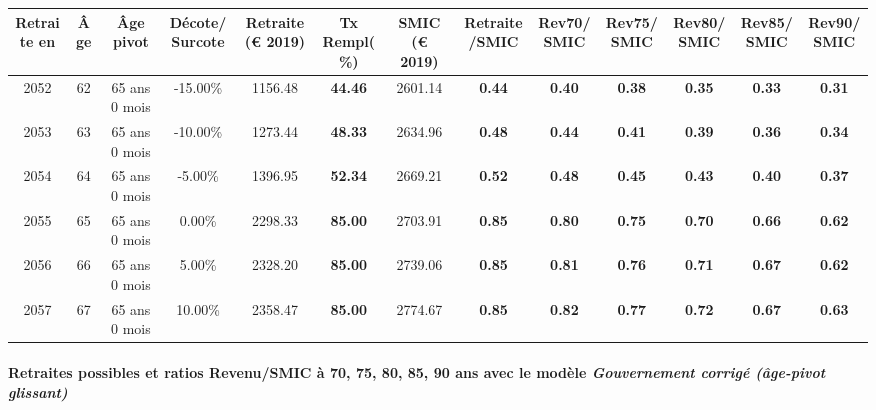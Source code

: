 { \scriptsize \begin{center} 
\begin{tabular}[htb]{|c|c||c|c||c|c||c||c|c|c|c|c|c|} 
\hline 
 Retraite en &  Âge &  Âge pivot &  Décote/Surcote &  Retraite (\euro{} 2019) &  Tx Rempl(\%) &  SMIC (\euro{} 2019) &  Retraite/SMIC &  Rev70/SMIC &  Rev75/SMIC &  Rev80/SMIC &  Rev85/SMIC &  Rev90/SMIC \\ 
\hline \hline 
 2052 &  62 &  65 ans 0 mois &  -15.00\% &  1156.48 &  {\bf 44.46} &  2601.14 &  {\bf {\color{red} 0.44}} &  {\bf {\color{red} 0.40}} &  {\bf {\color{red} 0.38}} &  {\bf {\color{red} 0.35}} &  {\bf {\color{red} 0.33}} &  {\bf {\color{red} 0.31}} \\ 
\hline 
 2053 &  63 &  65 ans 0 mois &  -10.00\% &  1273.44 &  {\bf 48.33} &  2634.96 &  {\bf {\color{red} 0.48}} &  {\bf {\color{red} 0.44}} &  {\bf {\color{red} 0.41}} &  {\bf {\color{red} 0.39}} &  {\bf {\color{red} 0.36}} &  {\bf {\color{red} 0.34}} \\ 
\hline 
 2054 &  64 &  65 ans 0 mois &  -5.00\% &  1396.95 &  {\bf 52.34} &  2669.21 &  {\bf {\color{red} 0.52}} &  {\bf {\color{red} 0.48}} &  {\bf {\color{red} 0.45}} &  {\bf {\color{red} 0.43}} &  {\bf {\color{red} 0.40}} &  {\bf {\color{red} 0.37}} \\ 
\hline 
 2055 &  65 &  65 ans 0 mois &  0.00\% &  2298.33 &  {\bf 85.00} &  2703.91 &  {\bf {\color{red} 0.85}} &  {\bf {\color{red} 0.80}} &  {\bf {\color{red} 0.75}} &  {\bf {\color{red} 0.70}} &  {\bf {\color{red} 0.66}} &  {\bf {\color{red} 0.62}} \\ 
\hline 
 2056 &  66 &  65 ans 0 mois &  5.00\% &  2328.20 &  {\bf 85.00} &  2739.06 &  {\bf {\color{red} 0.85}} &  {\bf {\color{red} 0.81}} &  {\bf {\color{red} 0.76}} &  {\bf {\color{red} 0.71}} &  {\bf {\color{red} 0.67}} &  {\bf {\color{red} 0.62}} \\ 
\hline 
 2057 &  67 &  65 ans 0 mois &  10.00\% &  2358.47 &  {\bf 85.00} &  2774.67 &  {\bf {\color{red} 0.85}} &  {\bf {\color{red} 0.82}} &  {\bf {\color{red} 0.77}} &  {\bf {\color{red} 0.72}} &  {\bf {\color{red} 0.67}} &  {\bf {\color{red} 0.63}} \\ 
\hline 
\hline 
\end{tabular} 
\end{center} } 
\paragraph{Retraites possibles et ratios Revenu/SMIC à 70, 75, 80, 85, 90 ans avec le modèle \emph{Gouvernement corrigé (âge-pivot glissant)}}  
 
